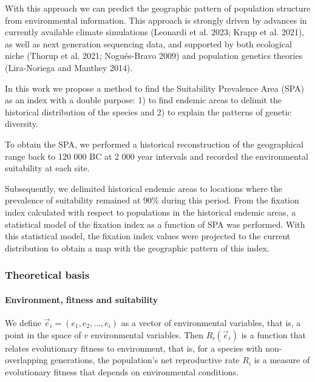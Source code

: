 \documentclass[
]{article}
\begin{document}
With this approach we can predict the geographic pattern of population
structure from environmental information. This approach is strongly
driven by advances in currently available climate simulations (Leonardi
et al. 2023; Krapp et al. 2021), as well as next generation sequencing
data, and supported by both ecological niche (Thorup et al. 2021;
Nogués-Bravo 2009) and population genetics theories (Lira-Noriega and
Manthey 2014).

In this work we propose a method to find the Suitability Prevalence Area
(SPA) as an index with a double purpose: 1) to find endemic areas to
delimit the historical distribution of the species and 2) to explain the
patterns of genetic diversity.

To obtain the SPA, we performed a historical reconstruction of the
geographical range back to 120 000 BC at 2 000 year intervals and
recorded the environmental suitability at each site.

Subsequently, we delimited historical endemic areas to locations where
the prevalence of suitability remained at 90\% during this period. From
the fixation index calculated with respect to populations in the
historical endemic areas, a statistical model of the fixation index as a
function of SPA was performed. With this statistical model, the fixation
index values were projected to the current distribution to obtain a map
with the geographic pattern of this index.

\hypertarget{theoretical-basis}{%
\subsubsection{Theoretical basis}\label{theoretical-basis}}

\hypertarget{environment-fitness-and-suitability}{%
\paragraph{Environment, fitness and
suitability}\label{environment-fitness-and-suitability}}

We define \(\vec{e}_i =(e_1, e_2, ..., e_i )\) as a vector of
environmental variables, that is, a point in the space of \(v\)
environmental variables. Then \(R_i(\vec{e}_i)\) is a function that
relates evolutionary fitness to environment, that is, for a species with
non-overlapping generations, the population's net reproductive rate
\(R_i\) is a measure of evolutionary fitness that depends on
environmental conditions.
\end{document}
